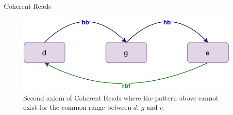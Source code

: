 \begin{axiom}{Coherent Reads}
\begin{itemize}
                    \begin{figure}[H]
                        \centering 
                        \includegraphics[scale=0.7]{3.ECMAScriptMemoryModel/CoherentReads2.pdf}
                        \caption{Second axiom of Coherent Reads where the pattern above cannot exist for the common range between $d$, $g$ and $e$.}
                        \label{model:coherent_reads(2)}
                    \end{figure}
                            
            \end{itemize}
        \end{axiom}

